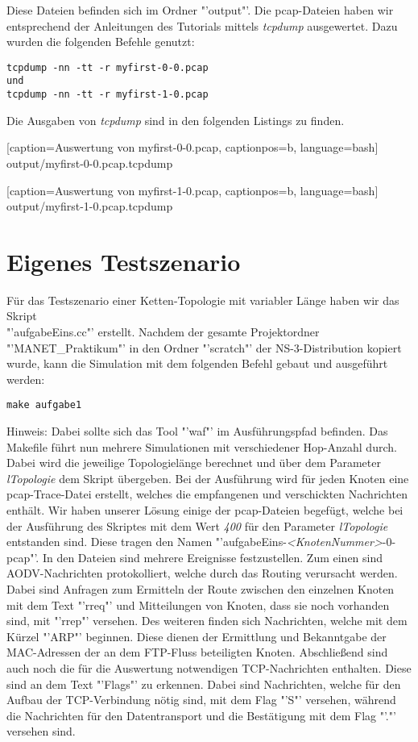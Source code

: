 \documentclass[12pt,a4paper,titlepage]{article}
\begin{document}
Diese Dateien befinden sich im Ordner "'output"'. Die pcap-Dateien haben wir entsprechend der Anleitungen des Tutorials mittels \textit{tcpdump} ausgewertet. Dazu wurden die folgenden Befehle genutzt:

\begin{lstlisting}
tcpdump -nn -tt -r myfirst-0-0.pcap
und
tcpdump -nn -tt -r myfirst-1-0.pcap
\end{lstlisting}

Die Ausgaben von \textit{tcpdump} sind in den folgenden Listings zu finden.


	[caption={Auswertung von myfirst-0-0.pcap}\label{lst:myfirst_1_pcap},
		captionpos=b,
		language=bash] %
	{output/myfirst-0-0.pcap.tcpdump}


	[caption={Auswertung von myfirst-1-0.pcap}\label{lst:myfirst_2_pcap},
		captionpos=b,
		language=bash] %
	{output/myfirst-1-0.pcap.tcpdump}

\section{Eigenes Testszenario}

Für das Testszenario einer Ketten-Topologie mit variabler Länge haben wir das Skript\\ "'aufgabeEins.cc"' erstellt. Nachdem der gesamte Projektordner "'MANET\_Praktikum"' in den Ordner "'scratch"' der NS-3-Distribution kopiert wurde, kann die Simulation mit dem folgenden Befehl gebaut und ausgeführt werden:

\begin{lstlisting}
make aufgabe1
\end{lstlisting}

Hinweis: Dabei sollte sich das Tool "'waf"' im Ausführungspfad befinden. Das Makefile führt nun mehrere Simulationen mit verschiedener Hop-Anzahl durch. Dabei wird die jeweilige Topologielänge berechnet und über dem Parameter \textit{lTopologie} dem Skript übergeben. Bei der Ausführung wird für jeden Knoten eine pcap-Trace-Datei erstellt, welches die empfangenen und verschickten Nachrichten enthält. Wir haben unserer Lösung einige der pcap-Dateien begefügt, welche bei der Ausführung des Skriptes mit dem Wert \textit{400} für den Parameter \textit{lTopologie} entstanden sind. Diese tragen den Namen "'aufgabeEins-\textit{\textless KnotenNummer\textgreater}-0-pcap"'. 
In den Dateien sind mehrere Ereignisse festzustellen. Zum einen sind AODV-Nachrichten protokolliert, welche durch das Routing verursacht werden. Dabei sind Anfragen zum Ermitteln der Route zwischen den einzelnen Knoten mit dem Text "'rreq"'  und Mitteilungen von Knoten, dass sie noch vorhanden sind, mit "'rrep"' versehen. 
Des weiteren finden sich Nachrichten, welche mit dem Kürzel "'ARP"' beginnen. Diese dienen der Ermittlung und Bekanntgabe der MAC-Adressen der an dem FTP-Fluss beteiligten Knoten. Abschließend sind auch noch die für die Auswertung notwendigen TCP-Nachrichten enthalten. Diese sind an dem Text "'Flags"' zu erkennen. Dabei sind Nachrichten, welche für den Aufbau der TCP-Verbindung nötig sind, mit dem Flag "'S"' versehen, während die Nachrichten für den Datentransport und die Bestätigung mit dem Flag "'."' versehen sind.
\end{document}
